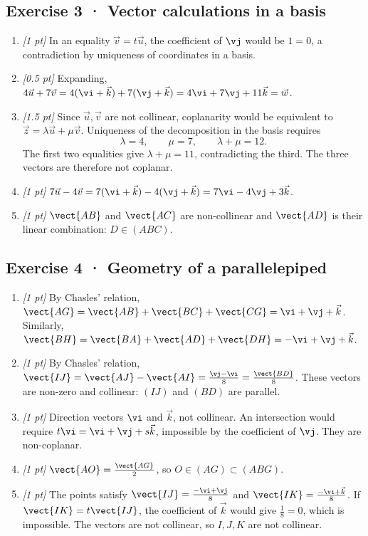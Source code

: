 \subsection*{Exercise 3 · Vector calculations in a basis}\begin{enumerate}

\item \textit{[1 pt]} In an equality $\vec v=t\vec u$, the coefficient of $\vj $ would be $1=0$, a contradiction by uniqueness of coordinates in a basis.

\item \textit{[0.5 pt]} Expanding, $4\vec u+7\vec v=4(\vi +\vec k)+7(\vj +\vec k)=4\vi +7\vj +11\vec k=\vec w$.

\item \textit{[1.5 pt]} Since $\vec u,\vec v$ are not collinear, coplanarity would be equivalent to $\vec z=\lambda\vec u+\mu\vec v$. Uniqueness of the decomposition in the basis requires
\[\lambda=4,\qquad\mu=7,\qquad\lambda+\mu=12.\]
The first two equalities give $\lambda+\mu=11$, contradicting the third. The three vectors are therefore not coplanar.

\item \textit{[1 pt]} $7\vec u-4\vec v=7(\vi +\vec k)-4(\vj +\vec k)=7\vi -4\vj +3\vec k$.

\item \textit{[1 pt]} $\vect{AB}$ and $\vect{AC}$ are non-collinear and $\vect{AD}$ is their linear combination: $D\in(ABC)$.

\end{enumerate}

\subsection*{Exercise 4 · Geometry of a parallelepiped}\begin{enumerate}

\item \textit{[1 pt]} By Chasles' relation, $\vect{AG}=\vect{AB}+\vect{BC}+\vect{CG}=\vi +\vj +\vec k$. Similarly, $\vect{BH}=\vect{BA}+\vect{AD}+\vect{DH}=-\vi +\vj +\vec k$.

\item \textit{[1 pt]} By Chasles' relation, $\vect{IJ}=\vect{AJ}-\vect{AI}=\frac{\vj -\vi }{8}=\frac{\vect{BD}}{8}$. These vectors are non-zero and collinear: $(IJ)$ and $(BD)$ are parallel.

\item \textit{[1 pt]} Direction vectors $\vi $ and $\vec k$, not collinear. An intersection would require $t\vi =\vi +\vj +s\vec k$, impossible by the coefficient of $\vj $. They are non-coplanar.

\item \textit{[1 pt]} $\vect{AO}=\frac{\vect{AG}}{2}$, so $O\in(AG)\subset(ABG)$.

\item \textit{[1 pt]} The points satisfy $\vect{IJ}=\frac{-\vi +\vj }{8}$ and $\vect{IK}=\frac{-\vi +\vec k}{8}$. If $\vect{IK}=t\vect{IJ}$, the coefficient of $\vec k$ would give $\frac{1}{8}=0$, which is impossible. The vectors are not collinear, so $I,J,K$ are not collinear.

\end{enumerate}

